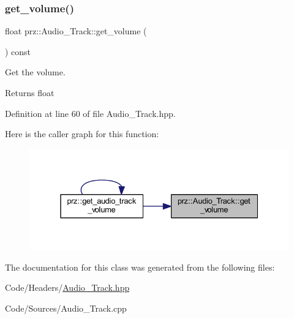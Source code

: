 \subsubsection{\texorpdfstring{get\_volume()}{get\_volume()}}
{\footnotesize\ttfamily float prz\+::\+Audio\+\_\+\+Track\+::get\+\_\+volume (\begin{DoxyParamCaption}{ }\end{DoxyParamCaption}) const\hspace{0.3cm}{\ttfamily [inline]}}



Get the volume. 

\begin{DoxyReturn}{Returns}
float 
\end{DoxyReturn}


Definition at line 60 of file Audio\+\_\+\+Track.\+hpp.

Here is the caller graph for this function\+:
\nopagebreak
\begin{figure}[H]
\begin{center}
\leavevmode
\includegraphics[width=331pt]{classprz_1_1_audio___track_ad3a1f86e10f7e128a5589b621ff28b45_icgraph}
\end{center}
\end{figure}


The documentation for this class was generated from the following files\+:\begin{DoxyCompactItemize}
\item 
Code/\+Headers/\mbox{\hyperlink{_audio___track_8hpp}{Audio\+\_\+\+Track.\+hpp}}\item 
Code/\+Sources/Audio\+\_\+\+Track.\+cpp\end{DoxyCompactItemize}
